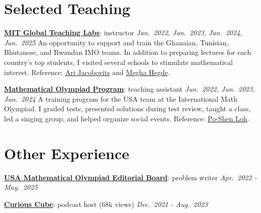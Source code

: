\documentclass[12pt,a4paper,sans]{moderncv}
\newcommand{\datedline}[2]{#1 \hfill \emph{#2}}
\newcommand{\entry}[4]{%
  \datedline{\textbf{#1}: #2}{#3}\newline
  {\small #4}}
\newcommand{\shortentry}[3]{%
  \datedline{\textbf{#1}: #2}{#3}\par
  \addvspace{10pt}}
\begin{document}
\section{Selected Teaching}
\entry
  {\href{https://news.mit.edu/2022/traveling-world-make-global-impact-0325}{MIT Global Teaching Labs}}
  {instructor}
  {Jan.\ 2022, Jan.\ 2023, Jan.\ 2024, Jan.\ 2025}
  {An opportunity to support and train the Ghanaian, Tunisian, Bhutanese, and Rwandan IMO
   teams. In addition to preparing lectures for each country's top students, I visited
   several schools to stimulate mathematical interest. Reference:
   \href{mailto:arijaco@mit.edu}{Ari Jacobovits} and
   \href{mailto:mhegde@mit.edu}{Megha Hegde}.}

\bigskip
\entry
  {\href{https://maa.org/maa-invitational-competitions/}{Mathematical Olympiad Program}}
  {teaching assistant}
  {Jun.\ 2022, Jun.\ 2023, Jun.\ 2024}
  {A training program for the USA team at the International Math Olympiad. I graded tests,
   presented solutions during test review, taught a class, led a singing group, and helped
   organize social events. Reference: \href{mailto:ploh@cmu.edu}{Po-Shen Loh}.}

\section{Other Experience}
\shortentry
  {\href{https://maa.org/maa-invitational-competitions/}{USA Mathematical Olympiad Editorial Board}}
  {problem writer}
  {Apr.\ 2022 - May.\ 2025}
\shortentry
  {\href{https://www.youtube.com/playlist?list=PLevtNOOa6SZX3d1pxOiOQ87j1Y-6ZMTPQ}{Curious Cube}}
  {podcast host (68k views)}
  {Dec.\ 2021 - Aug.\ 2023}
\end{document}
